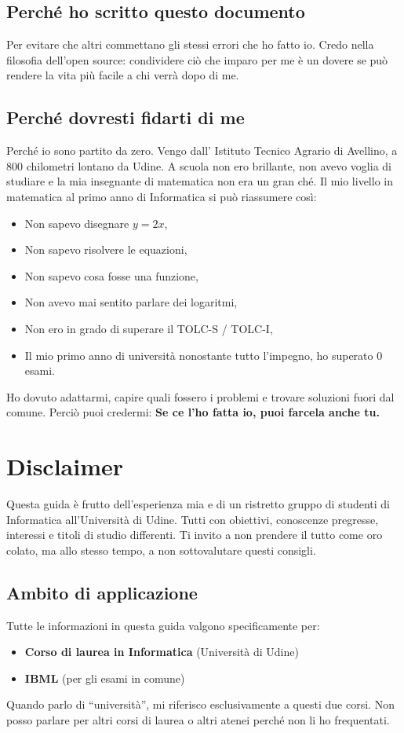 \documentclass[18pt]{extarticle}
\begin{document}
\subsection{Perché ho scritto questo documento}
Per evitare che altri commettano gli stessi errori che ho fatto io.  
Credo nella filosofia dell’open source: condividere ciò che imparo per me è un dovere se può rendere la vita più facile a chi verrà dopo di me.

\subsection{Perché dovresti fidarti di me}
Perché io sono partito da zero.  
Vengo dall' Istituto Tecnico Agrario di Avellino, a 800 chilometri lontano da Udine. 
A scuola non ero brillante, non avevo voglia di studiare e la mia insegnante di matematica non era un gran ché.  
Il mio livello in matematica al primo anno di Informatica si può riassumere così:
\begin{itemize}
\item Non sapevo disegnare $y = 2x$,
\item Non sapevo risolvere le equazioni,
\item Non sapevo cosa fosse una funzione,
\item Non avevo mai sentito parlare dei logaritmi,
\item Non ero in grado di superare il TOLC-S / TOLC-I, 
\item Il mio primo anno di università nonostante tutto l'impegno, ho superato 0 esami. 
\end{itemize}%
Ho dovuto adattarmi, capire quali fossero i problemi e trovare soluzioni fuori dal comune. 
Perciò puoi credermi: \textbf{Se ce l'ho fatta io, puoi farcela anche tu.}

\clearpage
\section{Disclaimer}
Questa guida è frutto dell'esperienza mia e di un ristretto gruppo di studenti di Informatica all'Università di Udine. Tutti con obiettivi, conoscenze pregresse, interessi e titoli di studio differenti.
Ti invito a non prendere il tutto come oro colato, ma allo stesso tempo, a non sottovalutare questi consigli.


\subsection{Ambito di applicazione}
Tutte le informazioni in questa guida valgono specificamente per:
\begin{itemize}
    \item \textbf{Corso di laurea in Informatica} (Università di Udine)
    \item \textbf{IBML} (per gli esami in comune)
\end{itemize}
Quando parlo di ``università'', mi riferisco esclusivamente a questi due corsi. Non posso parlare per altri corsi di laurea o altri atenei perché non li ho frequentati.
\end{document}
